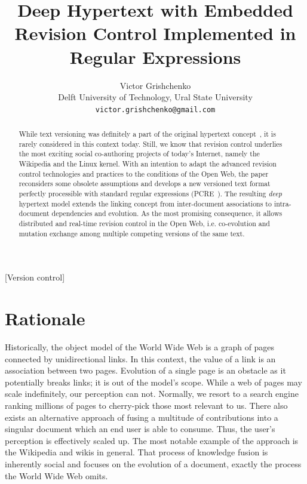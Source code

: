 \documentclass{sig-alternate}
\date{}
\begin{document}

\title{Deep Hypertext with Embedded Revision Control Implemented in Regular Expressions}

\author{Victor Grishchenko \\ \small Delft University of Technology, Ural State University \\ {\tt victor.grishchenko@gmail.com} }

\maketitle

\begin{abstract}
While text versioning was definitely a part of the original
hypertext concept~\cite{nls,literary,hyp-ed-sys},
it is rarely considered in this context today.
Still, we know that revision control underlies the most exciting
social co-authoring projects of today's Internet, namely the
Wikipedia and the Linux kernel. With an intention to adapt the
advanced revision control technologies and practices to the
conditions of the Open Web, the paper reconsiders some obsolete
assumptions and develops a new versioned text format perfectly
processible with standard regular expressions (PCRE~\cite{pcre}).
The resulting \emph{deep} hypertext model extends the linking
concept from inter-document associations to intra-document
dependencies and evolution. As the most promising consequence,
it allows distributed and real-time revision control in the Open
Web, i.e. co-evolution and mutation exchange among multiple
competing versions of the same text. 

\end{abstract}

[Version control]

\section{Rationale}

Historically, the object model of the World Wide Web is a graph of pages connected by unidirectional links.
In this context, the value of a link is an association between two pages.
Evolution of a single page is an obstacle as it potentially breaks links; it is out of the model’s scope.
While a web of pages may scale indefinitely, our perception can not. 
Normally, we resort to a search engine ranking millions of pages to cherry-pick those most relevant to us.
There also exists an alternative approach of fusing a multitude of contributions into a singular document which an end user is able to consume.
Thus, the user's perception is effectively scaled up.
The most notable example of the approach is the Wikipedia and wikis in general.
That process of knowledge fusion is inherently social and focuses on the evolution of a document, exactly the process the World Wide Web omits.
\end{document}
